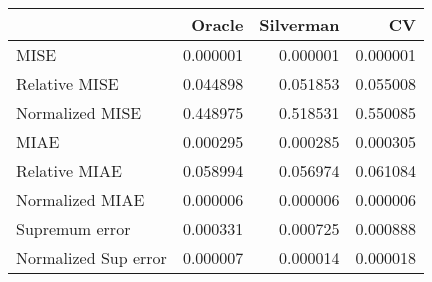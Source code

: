 \begin{tabular}{lrrr}
  \toprule
 & Oracle & Silverman & CV \\ 
  \midrule
MISE & 0.000001 & 0.000001 & 0.000001 \\ 
  Relative MISE & 0.044898 & 0.051853 & 0.055008 \\ 
  Normalized MISE & 0.448975 & 0.518531 & 0.550085 \\ 
  MIAE & 0.000295 & 0.000285 & 0.000305 \\ 
  Relative MIAE & 0.058994 & 0.056974 & 0.061084 \\ 
  Normalized MIAE & 0.000006 & 0.000006 & 0.000006 \\ 
  Supremum error & 0.000331 & 0.000725 & 0.000888 \\ 
  Normalized Sup error & 0.000007 & 0.000014 & 0.000018 \\ 
   \bottomrule
\end{tabular}
